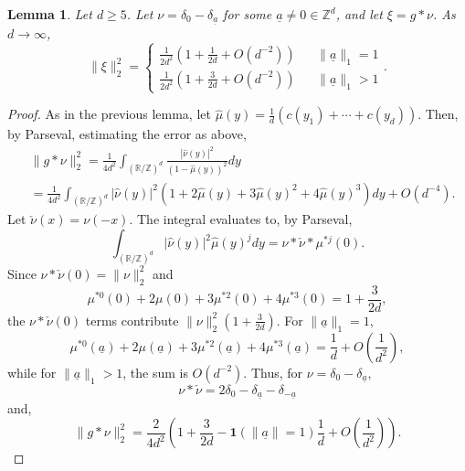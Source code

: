 \documentclass[a4paper, 12pt, notitlepage]{amsart}
\newcommand{\supp}{\operatorname{supp}}
\newcommand{\bR}{\mathbb{R}}
\newcommand{\zed}{\mathbb{Z}}
\newcommand{\one}{\mathbf{1}}
\newcommand{\ua}{\underline{a}}
\newtheorem{lemma}[theorem]{Lemma}
\theoremstyle{remark}
\begin{document}
\begin{lemma}\label{Greens_fn_evaluation_d_larger_support}
 Let $d \geq 5$.  Let $\nu = \delta_0 - \delta_{\ua}$ for some $\ua \neq 0 \in \zed^d$, and let $\xi = g*\nu$.  As $d \to \infty$,
  \begin{equation}
  \|\xi\|_{2}^2 = \left\{ \begin{array}{lll} \frac{1}{2d^2}\left(1 + \frac{1}{2d} + O\left(d^{-2}\right)\right) && \|\ua\|_1 = 1\\ \frac{1}{2d^2}\left(1 + \frac{3}{2d} + O\left(d^{-2}\right)\right) && \|\ua\|_1>1\end{array}\right..
 \end{equation}


\end{lemma}
\begin{proof}
 As in the previous lemma, let $\hat{\mu}(y) = \frac{1}{d}(c(y_1) + \cdots + c(y_d))$.  Then, by Parseval, estimating the error as above,
 \begin{align*}
  &\|g * \nu\|_2^2 = \frac{1}{4d^2} \int_{(\bR/\zed)^d} \frac{|\hat{\nu}(y)|^2}{(1-\hat{\mu}(y))^2}dy\\
  &= \frac{1}{4d^2}\int_{(\bR/\zed)^d} |\hat{\nu}(y)|^2 \left(1 + 2\hat{\mu}(y) + 3 \hat{\mu}(y)^2 + 4 \hat{\mu}(y)^3 \right)dy + O(d^{-4}).
 \end{align*}
Let $\check{\nu}(x) = \nu(-x)$.  The integral evaluates to, by Parseval,
\begin{equation*}
 \int_{(\bR/\zed)^d} |\hat{\nu}(y)|^2 \hat{\mu}(y)^j dy = \nu * \check{\nu} * \mu^{*j}(0).
\end{equation*}
Since $\nu * \check{\nu}(0) = \|\nu\|_2^2$ and \begin{equation*}\mu^{*0}(0)+ 2\mu(0) + 3 \mu^{*2}(0) + 4 \mu^{*3}(0) = 1 + \frac{3}{2d},\end{equation*} the $\nu*\check\nu(0)$ terms contribute $\|\nu\|_2^2 \left(1 + \frac{3}{2d}\right)$.  For $\|\ua\|_1 = 1$, \begin{equation}\mu^{*0}(\ua) + 2\mu(\ua) + 3\mu^{*2}(\ua) + 4 \mu^{*3}(\ua) = \frac{1}{d} + O\left(\frac{1}{d^2} \right),\end{equation} while for $\|\ua\|_1 > 1$, the sum is $O(d^{-2})$.  Thus, for $\nu = \delta_0 - \delta_{\ua}$, \begin{equation}\nu * \check{\nu} = 2 \delta_0 - \delta_{\ua} - \delta_{-\ua}\end{equation} and, 
\begin{equation}
 \|g*\nu\|_2^2 = \frac{2}{4d^2} \left(1 + \frac{3}{2d} - \one(\|\ua\|=1)\frac{1}{d} + O\left(\frac{1}{d^2}\right) \right).
\end{equation}
\end{proof}
\end{document}
